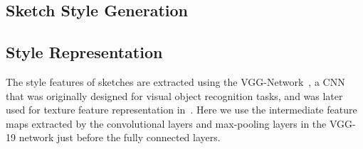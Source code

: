 \documentclass[10pt,twocolumn,letterpaper]{article}
\begin{document}
\subsection{Sketch Style Generation}

{
\subsection{Style Representation}
}
The style features of sketches are extracted using the VGG-Network~\cite{simonyan2014very}, a CNN that was originally designed for visual object recognition tasks, and was later used for texture feature representation in~\cite{gatys2015texture}. Here we use the intermediate feature maps extracted by the convolutional layers and max-pooling layers in the VGG-19 network just before the fully connected layers. 
\end{document}
